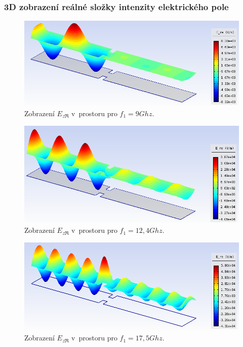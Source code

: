 \subsubsection*{3D zobrazení reálné složky intenzity elektrického pole}
\begin{figure}[!h]
	\centering
	\includegraphics[width=14cm]{priklad_R100narrow_Ere_9Ghz_3D.png}
	\caption{Zobrazení $E_{z\Re}$ v~prostoru pro $f_1 = 9\unit{Ghz}$.}
	\label{obr:priklad_R100narrow_Ere_9Ghz_3D}
\end{figure}
\begin{figure}[!h]
	\centering
	\includegraphics[width=14cm]{priklad_R100narrow_Ere_12Ghz_3D.png}
	\caption{Zobrazení $E_{z\Re}$ v~prostoru pro $f_1 = 12,4\unit{Ghz}$.}
	\label{obr:priklad_R100narrow_Ere_12Ghz_3D}
\end{figure}
\begin{figure}[!h]
	\centering
	\includegraphics[width=14cm]{priklad_R100narrow_Ere_17Ghz_3D.png}
	\caption{Zobrazení $E_{z\Re}$ v~prostoru pro $f_1 = 17,5\unit{Ghz}$.}
	\label{obr:priklad_R100narrow_Ere_17Ghz_3D}
\end{figure}

